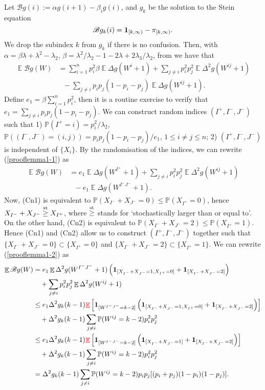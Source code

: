 \documentclass[12pt]{article}
\newcommand{\Pro}{\mathbb{P}}
\newcommand{\prob}{\Pro}
\DeclareMathOperator{\E}{\mathbb{E}}
\newcommand{\mean}{\E}
\newcommand{\bone}{{\bf 1}}
\newcommand{\scrB}{{\mathscr B}}
\def\Ref#1{(\ref{#1})}
\def\stg{\stackrel{\mbox{\scriptsize st}}{\ge }}
\newcounter{con}%
\numberwithin{equation}{section}
\begin{document}
 Let $\scrB g(i):=\alpha g(i+1)-\beta_i g(i)$, and $g_k$ be the solution to the Stein equation
 \begin{equation}
 \scrB g_k(i)=\bone_{[k,\infty)}-\pi_{[k,\infty)}.\label{steineq}
 \end{equation}
 We drop the subindex $k$ from $g_k$ if there is no confusion. Then, with $\alpha=\beta\lambda+\lambda^2-\lambda_2$,
 $\beta=\lambda^2/\lambda_2-1-2\lambda+2\lambda_3/\lambda_2$, from \cite[Page~1389]{BX01} we have that
 \begin{align}
 \mean \scrB g(W)&=\sum_{i=1}^np_i^2\beta\mean \Delta g(W^i+1)+\sum_{j\ne i}p_i^2p_j^2\mean\Delta^2g(W^{ij}+1)\nonumber\\
 &\ \ \ -\sum_{j\ne i}p_ip_j(1-p_i-p_j)\mean\Delta g(W^{ij}+1). \label{prooflemma1-1}
 \end{align}
 Define $e_1=\beta\sum_{i=1}^np_i^2$, then it is a routine exercise to verify that $e_1=\sum_{j\ne i} p_ip_j(1-p_i-p_j)$. We can construct random indices $(I^+,I^-,J^-)$ such that 1) $\prob(I^+=i)=p_i^2/\lambda_2$, $\prob((I^-,J^-)=(i,j))=p_ip_j(1-p_i-p_j)/e_1$, $1\le i\ne j\le n$; 2) $(I^+,I^-,J^-)$ is independent of $\{X_i\}$. By the randomisation of the indices, we can rewrite \Ref{prooflemma1-1} as
 \begin{align}
 \mean \scrB g(W)&=e_1\mean \Delta g(W^{I^+}+1)+\sum_{j\ne i}p_i^2p_j^2\mean\Delta^2g(W^{ij}+1)\nonumber\\
 &\ \ \ -e_1\mean\Delta g(W^{I^-J^-}+1). \label{prooflemma1-2}
 \end{align} 
 Now, (Cn1) is equivalent to $\prob(X_{I^-}+X_{J^-}=0)\le \prob(X_{I^+}=0)$, hence $X_{I^-}+X_{J^-}\stg X_{I^+}$, where $\stg$ stands for `stochastically larger than or equal to'. On the other hand, (Cn2) is equivalent to $\prob(X_{I^-}+X_{J^-}=2)\le \prob(X_{I^+}=1)$. Hence (Cn1) and (Cn2) allow us to construct $(I^+,I^-,J^-)$ together such that  $\{X_{I^-}+X_{J^-}=0\}\subset\{X_{I^+}=0\}$ and $\{X_{I^-}+X_{J^-}=2\}\subset \{X_{I^+}=1\}$. We can rewrite \Ref{prooflemma1-2} as
 \begin{align}
 \mean \scrB g(W)&=e_1\mean \Delta^2 g(W^{I^-J^-}+1)\left(\bone_{[X_{I^-}+X_{J^-}=1,X_{I^+}=0]}+\bone_{[X_{I^-}+X_{J^-}=2]}\right)
\nonumber \\
 & \ \ \ +\sum_{j\ne i}p_i^2p_j^2\mean\Delta^2g(W^{ij}+1)\nonumber\\
 &\le e_1\Delta^2 g_k(k-1)\textcolor{red}{\E}\left[\bone_{[W^{I^-J^-}=k-2]}\left(\bone_{[X_{I^-}+X_{J^-}=1,X_{I^+}=0]}+\bone_{[X_{I^-}+X_{J^-}=2]}\right)\right]
 \nonumber\\ & \ \ \ +\Delta^2 g_k(k-1)\sum_{j\ne i}\prob(W^{ij}=k-2)p_i^2p_j^2\nonumber\\
 &\le e_1\Delta^2 g_k(k-1)\textcolor{red}{\E}\left[\bone_{[W^{I^-J^-}=k-2]}\left(\bone_{[X_{I^-}+X_{J^-}=1]}+\bone_{[X_{I^-}+X_{J^-}=2]}\right)\right]
 \nonumber\\ & \ \ \ +\Delta^2 g_k(k-1)\sum_{j\ne i}\prob(W^{ij}=k-2)p_i^2p_j^2\nonumber\\
 &=\Delta^2 g_k(k-1)\sum_{j\ne i}\prob(W^{ij}=k-2)p_ip_j[(p_i+p_j)(1-p_i)(1-p_j)].
 \label{prooflemma1-3}
 \end{align}
\end{document}
